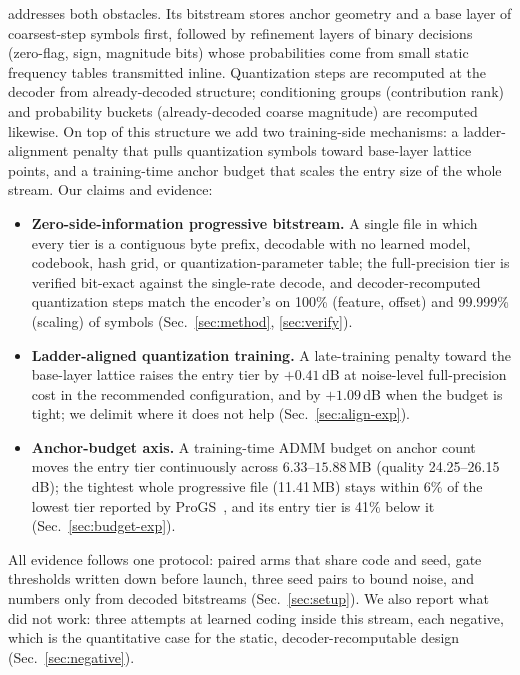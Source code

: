 \DCCA addresses both obstacles.
Its bitstream stores anchor geometry and a base layer of coarsest-step symbols first, followed by refinement layers of binary decisions (zero-flag, sign, magnitude bits) whose probabilities come from small static frequency tables transmitted inline.
Quantization steps are recomputed at the decoder from already-decoded structure; conditioning groups (contribution rank) and probability buckets (already-decoded coarse magnitude) are recomputed likewise.
On top of this structure we add two training-side mechanisms: a ladder-alignment penalty that pulls quantization symbols toward base-layer lattice points, and a training-time anchor budget that scales the entry size of the whole stream.
Our claims and evidence:
\begin{itemize}
\item \textbf{Zero-side-information progressive bitstream.}
A single file in which every tier is a contiguous byte prefix, decodable with no learned model, codebook, hash grid, or quantization-parameter table; the full-precision tier is verified bit-exact against the single-rate decode, and decoder-recomputed quantization steps match the encoder's on 100\% (feature, offset) and 99.999\% (scaling) of symbols (Sec.~\ref{sec:method}, \ref{sec:verify}).
\item \textbf{Ladder-aligned quantization training.}
A late-training penalty toward the base-layer lattice raises the entry tier by $+0.41$\,dB at noise-level full-precision cost in the recommended configuration, and by $+1.09$\,dB when the budget is tight; we delimit where it does not help (Sec.~\ref{sec:align-exp}).
\item \textbf{Anchor-budget axis.}
A training-time ADMM budget on anchor count moves the entry tier continuously across $6.33$--$15.88$\,MB (quality 24.25--26.15\,dB); the tightest whole progressive file (11.41\,MB) stays within 6\% of the lowest tier reported by ProGS~\cite{tang2026progs}, and its entry tier is 41\% below it (Sec.~\ref{sec:budget-exp}).
\end{itemize}
All evidence follows one protocol: paired arms that share code and seed, gate thresholds written down before launch, three seed pairs to bound noise, and numbers only from decoded bitstreams (Sec.~\ref{sec:setup}).
We also report what did not work: three attempts at learned coding inside this stream, each negative, which is the quantitative case for the static, decoder-recomputable design (Sec.~\ref{sec:negative}).
